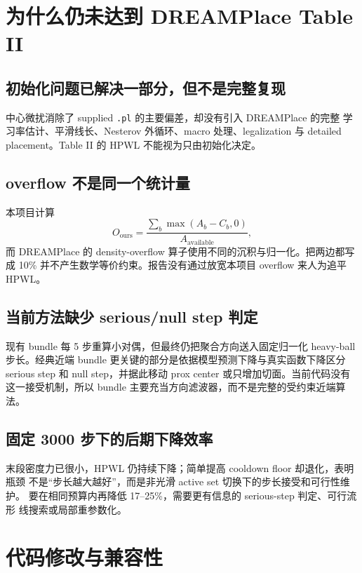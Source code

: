 \documentclass[UTF8,fontset=windows,a4paper,11pt]{ctexart}
\newcommand{\code}[1]{\texttt{#1}}
\begin{document}
\section{为什么仍未达到 DREAMPlace Table II}

\subsection{初始化问题已解决一部分，但不是完整复现}

中心微扰消除了 supplied \code{.pl} 的主要偏差，却没有引入 DREAMPlace 的完整
学习率估计、平滑线长、Nesterov 外循环、macro 处理、legalization 与 detailed
placement。Table II 的 HPWL 不能视为只由初始化决定。

\subsection{overflow 不是同一个统计量}

本项目计算
\begin{equation}
 O_{\mathrm{ours}}=
 \frac{\sum_b\max(A_b-C_b,0)}{A_{\mathrm{available}}},
\end{equation}
而 DREAMPlace 的 density-overflow 算子使用不同的沉积与归一化。把两边都写成
10\% 并不产生数学等价约束。报告没有通过放宽本项目 overflow 来人为追平 HPWL。

\subsection{当前方法缺少 serious/null step 判定}

现有 bundle 每 5 步重算小对偶，但最终仍把聚合方向送入固定归一化 heavy-ball
步长。经典近端 bundle 更关键的部分是依据模型预测下降与真实函数下降区分
serious step 和 null step，并据此移动 prox center 或只增加切面。当前代码没有
这一接受机制，所以 bundle 主要充当方向滤波器，而不是完整的受约束近端算法。

\subsection{固定 3000 步下的后期下降效率}

末段密度力已很小，HPWL 仍持续下降；简单提高 cooldown floor 却退化，表明瓶颈
不是“步长越大越好”，而是非光滑 active set 切换下的步长接受和可行性维护。
要在相同预算内再降低 17--25\%，需要更有信息的 serious-step 判定、可行流形
线搜索或局部重参数化。

\section{代码修改与兼容性}
\end{document}
